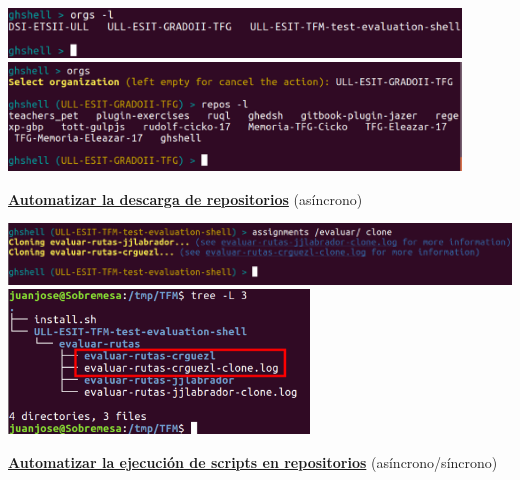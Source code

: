 \documentclass{beamer}
\begin{document}
\begin{frame}[allowframebreaks]
  \begin{center}
	  \includegraphics[width=0.9\textwidth]{images/ghshell3.eps}
	  \newline
	  \newline
  	  \includegraphics[width=0.9\textwidth]{images/ghshell4.eps}
  \end{center}
  \framebreak
  
  \underline{{\bfseries Automatizar la descarga de repositorios}} (asíncrono)
  
  \begin{center}
  	\includegraphics[width=1\textwidth]{images/ghshell6-1.eps}
  	\newline
  	\newline
  	\includegraphics[width=0.6\textwidth]{images/ghshell6-2e.eps}
  \end{center}
  
  \framebreak
  
  \underline{{\bfseries Automatizar la ejecución de scripts en repositorios}} (asíncrono/síncrono)
  

\end{frame}
\end{document}
